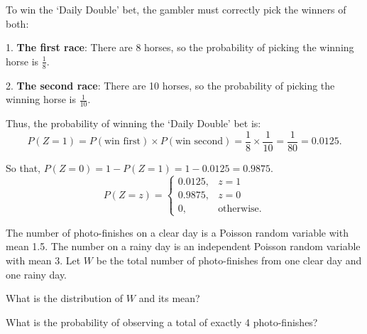 \documentclass[a4paper, 10pt]{article}
\begin{document}
\begin{solution}
	To win the `Daily Double' bet, the gambler must correctly pick the winners of both:
	\par 1. \textbf{The first race}: There are 8 horses, so the probability of picking the winning horse is \( \frac{1}{8} \).
	\par 2. \textbf{The second race}: There are 10 horses, so the probability of picking the winning horse is \( \frac{1}{10} \).

	\myspace

	Thus, the probability of winning the `Daily Double' bet is:
	\[
		P(Z = 1) = P(\text{win first}) \times P(\text{win second}) = \frac{1}{8} \times \frac{1}{10} = \frac{1}{80} = \boxed{0.0125}.
	\]

	So that, \( P(Z = 0) = 1 - P(Z = 1) = 1 - 0.0125 = 0.9875 \).
	\[
		P(Z = z) =
		\begin{cases}
			0.0125, & z=1               \\
			0.9875, & z=0               \\
			0,      & \text{otherwise.}
		\end{cases}
	\]

\end{solution}

\pagebreak

\begin{problem}
The number of photo-finishes on a clear day is a Poisson random variable with mean 1.5.
The number on a rainy day is an independent Poisson random variable with mean 3.
Let \( W \) be the total number of photo-finishes from one clear day and one rainy day.
\begin{subproblems_alpha}
	\item What is the distribution of \( W \) and its mean?
	\item What is the probability of observing a total of exactly 4 photo-finishes?
\end{subproblems_alpha}
\end{problem}
\end{document}
